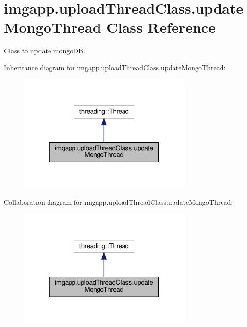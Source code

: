 \hypertarget{classimgapp_1_1uploadThreadClass_1_1updateMongoThread}{}\section{imgapp.\+upload\+Thread\+Class.\+update\+Mongo\+Thread Class Reference}
\label{classimgapp_1_1uploadThreadClass_1_1updateMongoThread}


Class to update mongo\+DB.  




Inheritance diagram for imgapp.\+upload\+Thread\+Class.\+update\+Mongo\+Thread\+:
\nopagebreak
\begin{figure}[H]
\begin{center}
\leavevmode
\includegraphics[width=247pt]{classimgapp_1_1uploadThreadClass_1_1updateMongoThread__inherit__graph}
\end{center}
\end{figure}


Collaboration diagram for imgapp.\+upload\+Thread\+Class.\+update\+Mongo\+Thread\+:
\nopagebreak
\begin{figure}[H]
\begin{center}
\leavevmode
\includegraphics[width=247pt]{classimgapp_1_1uploadThreadClass_1_1updateMongoThread__coll__graph}
\end{center}
\end{figure}

